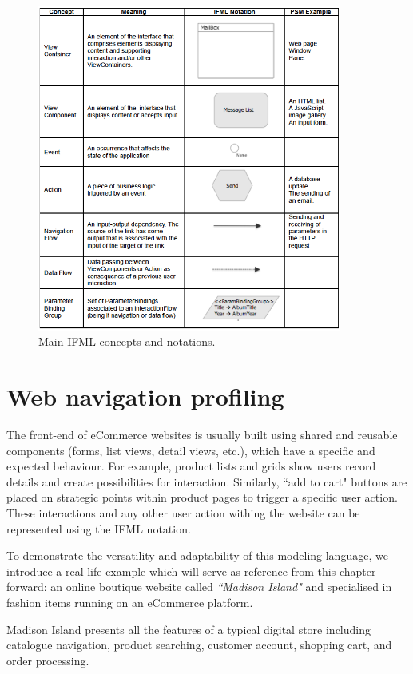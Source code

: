 \vspace{0.5cm}
\begin{figure}[H]
  \centering
    \includegraphics[width=10cm]{images/ifml.jpg}
  \caption{Main IFML concepts and notations.}
  \label{fig:ifml}
\end{figure}
\vspace{0.5cm}

\newpage

\section{Web navigation profiling}
\label{navigational-modeling-for-the-web}
The front-end of eCommerce websites is usually built using shared and reusable components (forms, list views, detail views, etc.), which have a specific and expected behaviour.
For example, product lists and grids show users record details and create possibilities for interaction. Similarly, ``add to cart" buttons are placed on strategic points within product pages to trigger a specific user action.
These interactions and any other user action withing the website can be represented using the IFML notation.

To demonstrate the versatility and adaptability of this modeling language, we introduce a real-life example which will serve as reference from this chapter forward: an online boutique website called \textit{``Madison Island"} and specialised in fashion items running on an eCommerce platform.

Madison Island presents all the features of a typical digital store including catalogue navigation, product searching, customer account, shopping cart, and order processing. 

